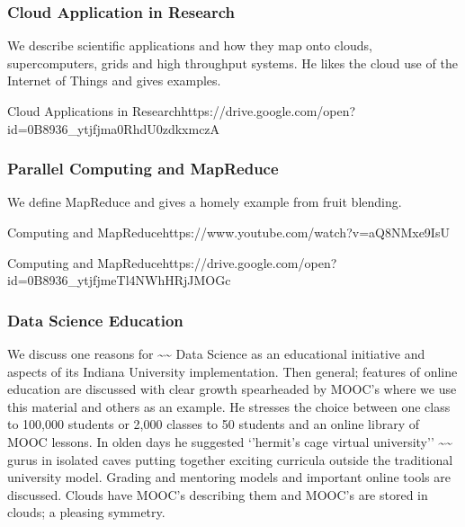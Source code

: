 \subsubsection{Cloud Application in
Research}\label{cloud-application-in-research}

We describe scientific applications and how they map onto clouds,
supercomputers, grids and high throughput systems. He likes the cloud
use of the Internet of Things and gives examples.




  {Cloud  Applications in Research}{https://drive.google.com/open?id=0B8936_ytjfjma0RhdU0zdkxmczA}

\subsubsection{Parallel Computing and
MapReduce}\label{parallel-computing-and-mapreduce}

We define MapReduce and gives a homely example from fruit blending.


  {Computing and  MapReduce}{https://www.youtube.com/watch?v=aQ8NMxe9IsU}


  {Computing  and MapReduce}{https://drive.google.com/open?id=0B8936_ytjfjmeTl4NWhHRjJMOGc}

\subsubsection{Data Science Education}\label{data-science-education}

We discuss one reasons for
\textasciitilde{}\textasciitilde{} Data Science as an educational
initiative and aspects of its Indiana University implementation. Then
general; features of online education are discussed with clear growth
spearheaded by MOOC's where we use this material and others as an example.
He stresses the choice between one class to 100,000 students or 2,000
classes to 50 students and an online library of MOOC lessons. In olden
days he suggested `'hermit's cage virtual university''
\textasciitilde{}\textasciitilde{} gurus in isolated caves putting
together exciting curricula outside the traditional university model.
Grading and mentoring models and important online tools are discussed.
Clouds have MOOC's describing them and MOOC's are stored in clouds; a
pleasing symmetry.



